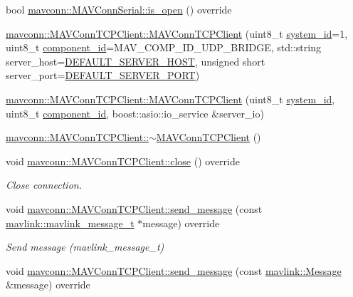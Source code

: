 \begin{DoxyCompactItemize}
bool \mbox{\hyperlink{group__mavconn_ga7b2ae62cddd41671b3312050f64b3036}{mavconn\+::\+M\+A\+V\+Conn\+Serial\+::is\+\_\+open}} () override
\item 
\mbox{\hyperlink{group__mavconn_ga930d7bcb750e00606a1ba406135f0020}{mavconn\+::\+M\+A\+V\+Conn\+T\+C\+P\+Client\+::\+M\+A\+V\+Conn\+T\+C\+P\+Client}} (uint8\+\_\+t \mbox{\hyperlink{setHome_8cpp_a83150acb88d810ae6864b4c125324ed6}{system\+\_\+id}}=1, uint8\+\_\+t \mbox{\hyperlink{setHome_8cpp_adc84285d5da2c4fa9721d0a32d5e41a7}{component\+\_\+id}}=M\+A\+V\+\_\+\+C\+O\+M\+P\+\_\+\+I\+D\+\_\+\+U\+D\+P\+\_\+\+B\+R\+I\+D\+GE, std\+::string server\+\_\+host=\mbox{\hyperlink{group__mavconn_ga25f08b85aaeacae255d37a898f978c42}{D\+E\+F\+A\+U\+L\+T\+\_\+\+S\+E\+R\+V\+E\+R\+\_\+\+H\+O\+ST}}, unsigned short server\+\_\+port=\mbox{\hyperlink{group__mavconn_ga3d9c438ece25a8aa6ae7af15341e7706}{D\+E\+F\+A\+U\+L\+T\+\_\+\+S\+E\+R\+V\+E\+R\+\_\+\+P\+O\+RT}})
\item 
\mbox{\hyperlink{group__mavconn_ga93a7b76eccf987b4321f7bcc502001b8}{mavconn\+::\+M\+A\+V\+Conn\+T\+C\+P\+Client\+::\+M\+A\+V\+Conn\+T\+C\+P\+Client}} (uint8\+\_\+t \mbox{\hyperlink{setHome_8cpp_a83150acb88d810ae6864b4c125324ed6}{system\+\_\+id}}, uint8\+\_\+t \mbox{\hyperlink{setHome_8cpp_adc84285d5da2c4fa9721d0a32d5e41a7}{component\+\_\+id}}, boost\+::asio\+::io\+\_\+service \&server\+\_\+io)
\item 
\mbox{\hyperlink{group__mavconn_gaa9e9ea305aaaa39aeb4bcb91328d47c5}{mavconn\+::\+M\+A\+V\+Conn\+T\+C\+P\+Client\+::$\sim$\+M\+A\+V\+Conn\+T\+C\+P\+Client}} ()
\item 
void \mbox{\hyperlink{group__mavconn_ga3128ab3303f5a303be12c2c9df1ee321}{mavconn\+::\+M\+A\+V\+Conn\+T\+C\+P\+Client\+::close}} () override
\begin{DoxyCompactList}\small\item\em Close connection. \end{DoxyCompactList}\item 
void \mbox{\hyperlink{group__mavconn_ga6f835299707df78f3694cef5853139d4}{mavconn\+::\+M\+A\+V\+Conn\+T\+C\+P\+Client\+::send\+\_\+message}} (const \mbox{\hyperlink{include__v0_89_2mavlink__types_8h_a63b963764c09dc72f4910c1521e325b9}{mavlink\+::mavlink\+\_\+message\+\_\+t}} $\ast$message) override
\begin{DoxyCompactList}\small\item\em Send message (mavlink\+\_\+message\+\_\+t) \end{DoxyCompactList}\item 
void \mbox{\hyperlink{group__mavconn_ga1194ffc5b74604c5c432591751803f33}{mavconn\+::\+M\+A\+V\+Conn\+T\+C\+P\+Client\+::send\+\_\+message}} (const \mbox{\hyperlink{structmavlink_1_1Message}{mavlink\+::\+Message}} \&message) override

\end{DoxyCompactItemize}
